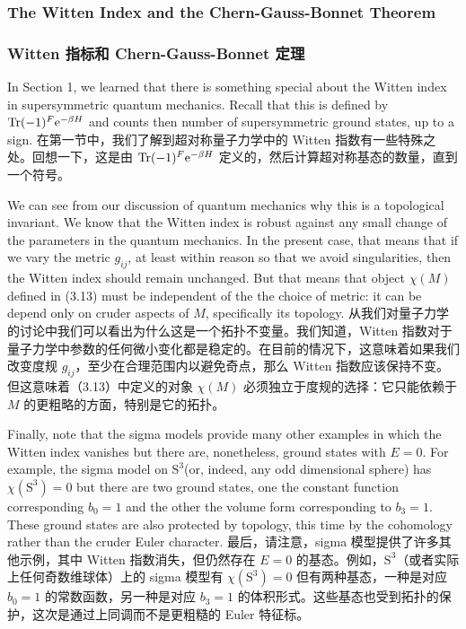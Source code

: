\documentclass{ctexart}
\newcommand{\rme}{\mathrm{e}}
\begin{document}
\begin{paracol}{2}
\subsubsection{The Witten Index and the Chern-Gauss-Bonnet Theorem}
\switchcolumn
\subsubsection*{Witten 指标和 Chern-Gauss-Bonnet 定理}
\switchcolumn*

In Section 1, we learned that there is something special about the Witten index in supersymmetric quantum mechanics. Recall that this is defined by $\Tr (- 1)^{F} \rme^{- \beta H}$ and counts then number of supersymmetric ground states, up to a sign.
\switchcolumn
在第一节中，我们了解到超对称量子力学中的 Witten 指数有一些特殊之处。回想一下，这是由 $\Tr (- 1)^{F} \rme^{- \beta H}$ 定义的，然后计算超对称基态的数量，直到一个符号。
\switchcolumn*

We can see from our discussion of quantum mechanics why this is a topological invariant. We know that the Witten index is robust against any small change of the parameters in the quantum mechanics. In the present case, that means that if we vary the metric $g_{ij}$, at least within reason so that we avoid singularities, then the Witten index should remain unchanged. But that means that object $\chi(M)$ defined in (3.13) must be independent of the the choice of metric: it can be depend only on cruder aspects of $M$, specifically its topology.
\switchcolumn
从我们对量子力学的讨论中我们可以看出为什么这是一个拓扑不变量。我们知道，Witten 指数对于量子力学中参数的任何微小变化都是稳定的。在目前的情况下，这意味着如果我们改变度规 $g_{ij}$，至少在合理范围内以避免奇点，那么 Witten 指数应该保持不变。但这意味着（3.13）中定义的对象 $\chi(M)$ 必须独立于度规的选择：它只能依赖于 $M$ 的更粗略的方面，特别是它的拓扑。
\switchcolumn*

Finally, note that the sigma models provide many other examples in which the Witten index vanishes but there are, nonetheless, ground states with $E = 0$. For example, the sigma model on $\bm{\mathrm{S}}^3$(or, indeed, any odd dimensional sphere) has $\chi(\bm{\mathrm{S}}^3) = 0$ but there are two ground states, one the constant function corresponding $b_0 = 1$ and the other the volume form corresponding to $b_3 = 1$. These ground states are also protected by topology, this time by the cohomology rather than the cruder Euler character.
\switchcolumn
最后，请注意，sigma 模型提供了许多其他示例，其中 Witten 指数消失，但仍然存在 $E = 0$ 的基态。例如，$\bm{\mathrm{S}}^3$（或者实际上任何奇数维球体）上的 sigma 模型有 $\chi(\bm{\mathrm{S}}^3) = 0$ 但有两种基态，一种是对应 $b_0 = 1$ 的常数函数，另一种是对应 $b_3 = 1$ 的体积形式。这些基态也受到拓扑的保护，这次是通过上同调而不是更粗糙的 Euler 特征标。
\switchcolumn*


\end{paracol}
\end{document}
